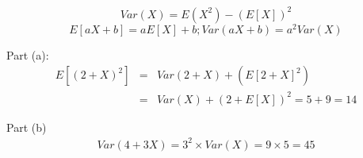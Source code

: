 \documentclass[slidestop,compress,mathserif]{beamer}
\begin{document}
\begin{frame}

\pause
\[
Var(X) 	  =  E(X^2)-(E[X])^2
\]
\[
E[aX + b] = aE[X] + b; Var(aX+b) = a^2 Var(X)
\]

Part (a):
\begin{eqnarray*}
E[(2 + X)^2] &=& Var(2 + X) + (E[2 + X]^2) \\
&=& Var(X) + (2 + E[X])^2 = 5 + 9 = 14
\end{eqnarray*}

Part (b)
\begin{eqnarray*}
Var(4 + 3X) = 3^2 \times Var(X) = 9 \times 5 = 45
\end{eqnarray*}

\end{frame}

\end{document}
